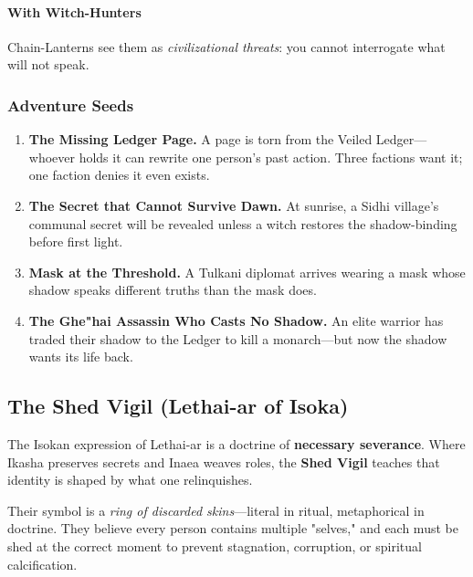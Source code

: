 \documentclass[11pt]{book}
\begin{document}
\paragraph{With Witch-Hunters}
Chain-Lanterns see them as \emph{civilizational threats}: you cannot interrogate what will not speak.

\subsubsection{Adventure Seeds}

\begin{enumerate}[leftmargin=*]
    \item \textbf{The Missing Ledger Page.}  
    A page is torn from the Veiled Ledger---whoever holds it can rewrite one person's past action.  
    Three factions want it; one faction denies it even exists.

    \item \textbf{The Secret that Cannot Survive Dawn.}  
    At sunrise, a Sidhi village's communal secret will be revealed unless a witch restores the shadow-binding before first light.

    \item \textbf{Mask at the Threshold.}  
    A Tulkani diplomat arrives wearing a mask whose shadow speaks different truths than the mask does.

    \item \textbf{The Ghe"hai Assassin Who Casts No Shadow.}  
    An elite warrior has traded their shadow to the Ledger to kill a monarch---but now the shadow wants its life back.
\end{enumerate}

\subsection{The Shed Vigil (Lethai-ar of Isoka)}

The Isokan expression of Lethai-ar is a doctrine of \textbf{necessary severance}.  
Where Ikasha preserves secrets and Inaea weaves roles, the \textbf{Shed Vigil} teaches that identity is shaped by what one relinquishes.  

Their symbol is a \emph{ring of discarded skins}---literal in ritual, metaphorical in doctrine.  
They believe every person contains multiple "selves," and each must be shed at the correct moment to prevent stagnation, corruption, or spiritual calcification.
\end{document}
